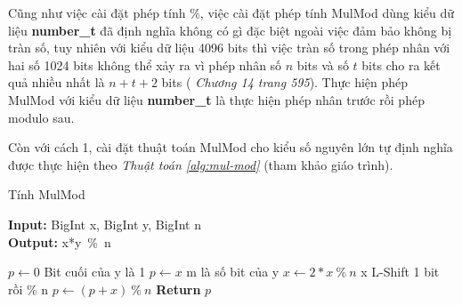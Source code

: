 Cũng như việc cài đặt phép tính \%, việc cài đặt phép tính MulMod dùng kiểu dữ liệu \textbf{number\_t} đã định nghĩa không có gì đặc biệt ngoài việc đảm bảo 
không bị tràn số, tuy nhiên với kiểu dữ liệu 4096 bits thì việc tràn số trong phép nhân với hai số 1024 bits không thể xảy ra vì phép nhân số $n$ bits và số $t$ bits 
cho ra kết quả nhiều nhất là $n + t + 2$ bits (\textit{\cite{Menezes} Chương 14 trang 595}). Thực hiện phép MulMod với kiểu dữ liệu \textbf{number\_t} là thực hiện phép nhân 
trước rồi phép modulo sau.

Còn với cách 1, cài đặt thuật toán MulMod cho kiểu số nguyên lớn tự định nghĩa được thực hiện theo \textit{Thuật toán \ref{alg:mul-mod}} (tham khảo giáo trình).

\begin{algorithm}
\caption{Tính MulMod}\label{alg:mul-mod}
\hspace*{\algorithmicindent} \textbf{Input:} BigInt x, BigInt y, BigInt n\\
\hspace*{\algorithmicindent} \textbf{Output:} x*y\ \%\ n
\begin{algorithmic}[1]
\State $p \gets 0$
 \Comment Bit cuối của y là 1
\State $p \gets x$
\EndIf
{}\Comment m là số bit của y
\State $x \gets 2*x\ \%\ n$ \Comment x L-Shift 1 bit rồi \% n
\State $p \gets (p+x)\ \%\ n$
\EndIf
\EndFor
\State \textbf{Return } $p$
\EndProcedure
\end{algorithmic}
\end{algorithm}